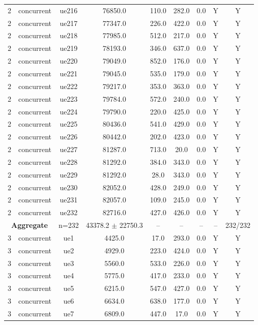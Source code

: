 \begin{table}[ht]
\begin{tabular}{|c|c|c|c|c|c|c|c|c|}
2 & concurrent & ue216 & 76850.0 & 110.0 & 282.0 & 0.0 & Y & Y \\
2 & concurrent & ue217 & 77347.0 & 226.0 & 422.0 & 0.0 & Y & Y \\
2 & concurrent & ue218 & 77985.0 & 512.0 & 217.0 & 0.0 & Y & Y \\
2 & concurrent & ue219 & 78193.0 & 346.0 & 637.0 & 0.0 & Y & Y \\
2 & concurrent & ue220 & 79049.0 & 852.0 & 176.0 & 0.0 & Y & Y \\
2 & concurrent & ue221 & 79045.0 & 535.0 & 179.0 & 0.0 & Y & Y \\
2 & concurrent & ue222 & 79217.0 & 353.0 & 363.0 & 0.0 & Y & Y \\
2 & concurrent & ue223 & 79784.0 & 572.0 & 240.0 & 0.0 & Y & Y \\
2 & concurrent & ue224 & 79790.0 & 220.0 & 425.0 & 0.0 & Y & Y \\
2 & concurrent & ue225 & 80436.0 & 541.0 & 429.0 & 0.0 & Y & Y \\
2 & concurrent & ue226 & 80442.0 & 202.0 & 423.0 & 0.0 & Y & Y \\
2 & concurrent & ue227 & 81287.0 & 713.0 & 20.0 & 0.0 & Y & Y \\
2 & concurrent & ue228 & 81292.0 & 384.0 & 343.0 & 0.0 & Y & Y \\
2 & concurrent & ue229 & 81292.0 & 28.0 & 343.0 & 0.0 & Y & Y \\
2 & concurrent & ue230 & 82052.0 & 428.0 & 249.0 & 0.0 & Y & Y \\
2 & concurrent & ue231 & 82057.0 & 109.0 & 245.0 & 0.0 & Y & Y \\
2 & concurrent & ue232 & 82716.0 & 427.0 & 426.0 & 0.0 & Y & Y \\
\multicolumn{2}{|c|}{\textbf{Aggregate}} & n=232 & 43378.2 $\pm$ 22750.3 & -- & -- & -- & -- & 232/232 \\
\hline
3 & concurrent & ue1 & 4425.0 & 17.0 & 293.0 & 0.0 & Y & Y \\
3 & concurrent & ue2 & 4929.0 & 223.0 & 424.0 & 0.0 & Y & Y \\
3 & concurrent & ue3 & 5560.0 & 533.0 & 226.0 & 0.0 & Y & Y \\
3 & concurrent & ue4 & 5775.0 & 417.0 & 233.0 & 0.0 & Y & Y \\
3 & concurrent & ue5 & 6215.0 & 547.0 & 427.0 & 0.0 & Y & Y \\
3 & concurrent & ue6 & 6634.0 & 638.0 & 177.0 & 0.0 & Y & Y \\
3 & concurrent & ue7 & 6809.0 & 447.0 & 17.0 & 0.0 & Y & Y \\

\end{tabular}
\end{table}
